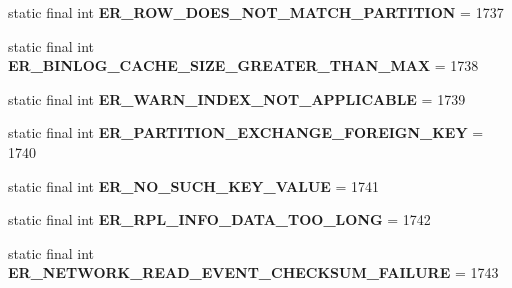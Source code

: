 \begin{DoxyCompactItemize}
static final int {\bfseries E\+R\+\_\+\+R\+O\+W\+\_\+\+D\+O\+E\+S\+\_\+\+N\+O\+T\+\_\+\+M\+A\+T\+C\+H\+\_\+\+P\+A\+R\+T\+I\+T\+I\+ON} = 1737
\item 
\mbox{\label{classcom_1_1mysql_1_1jdbc_1_1_mysql_error_numbers_a24f9465c1e004f22b3b1fcf4a803f224}} 
static final int {\bfseries E\+R\+\_\+\+B\+I\+N\+L\+O\+G\+\_\+\+C\+A\+C\+H\+E\+\_\+\+S\+I\+Z\+E\+\_\+\+G\+R\+E\+A\+T\+E\+R\+\_\+\+T\+H\+A\+N\+\_\+\+M\+AX} = 1738
\item 
\mbox{\label{classcom_1_1mysql_1_1jdbc_1_1_mysql_error_numbers_ad99d48201a251555099208253dfa4fc6}} 
static final int {\bfseries E\+R\+\_\+\+W\+A\+R\+N\+\_\+\+I\+N\+D\+E\+X\+\_\+\+N\+O\+T\+\_\+\+A\+P\+P\+L\+I\+C\+A\+B\+LE} = 1739
\item 
\mbox{\label{classcom_1_1mysql_1_1jdbc_1_1_mysql_error_numbers_a62d72408d04db42ce1f362b0c6637299}} 
static final int {\bfseries E\+R\+\_\+\+P\+A\+R\+T\+I\+T\+I\+O\+N\+\_\+\+E\+X\+C\+H\+A\+N\+G\+E\+\_\+\+F\+O\+R\+E\+I\+G\+N\+\_\+\+K\+EY} = 1740
\item 
\mbox{\label{classcom_1_1mysql_1_1jdbc_1_1_mysql_error_numbers_a6838f595c0369adc6de62cb8d67a6877}} 
static final int {\bfseries E\+R\+\_\+\+N\+O\+\_\+\+S\+U\+C\+H\+\_\+\+K\+E\+Y\+\_\+\+V\+A\+L\+UE} = 1741
\item 
\mbox{\label{classcom_1_1mysql_1_1jdbc_1_1_mysql_error_numbers_a2b92d89a5f6eccbe96a608abd26c2e34}} 
static final int {\bfseries E\+R\+\_\+\+R\+P\+L\+\_\+\+I\+N\+F\+O\+\_\+\+D\+A\+T\+A\+\_\+\+T\+O\+O\+\_\+\+L\+O\+NG} = 1742
\item 
\mbox{\label{classcom_1_1mysql_1_1jdbc_1_1_mysql_error_numbers_afde65a456f26e23b9a571d7e40af6d93}} 
static final int {\bfseries E\+R\+\_\+\+N\+E\+T\+W\+O\+R\+K\+\_\+\+R\+E\+A\+D\+\_\+\+E\+V\+E\+N\+T\+\_\+\+C\+H\+E\+C\+K\+S\+U\+M\+\_\+\+F\+A\+I\+L\+U\+RE} = 1743
\item 
\mbox{\label{classcom_1_1mysql_1_1jdbc_1_1_mysql_error_numbers_a7d04c0ceaadf8c88f103d230f0d500a2}} 

\end{DoxyCompactItemize}
